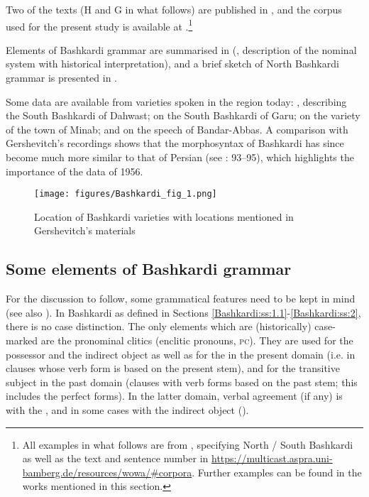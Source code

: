 \documentclass[output=paper,colorlinks,citecolor=brown]{langscibook}
\begin{document}
Two of the texts (H and G in what follows) are published in \citet{korn_bashkardi_2021,korn_greeting_2021}, and the corpus used for the present study is available at \citet{korn_bashkardi_N_2022,korn_bashkardi_S_2022}.\footnote{\label{fn:korn:3}All examples in what follows are from \citet{korn_bashkardi_N_2022,korn_bashkardi_S_2022}, specifying North / South Bashkardi as well as the text and sentence number in \url{https://multicast.aspra.uni-bamberg.de/resources/wowa/\#corpora}. Further examples can be found in the works mentioned in this section.}

Elements of Bashkardi grammar are summarised in \citeauthor{korn_notes_2017} (\citeyear{korn_notes_2017}, description of the nominal system with historical interpretation), and a brief sketch of North Bashkardi grammar is presented in \citet{korn_greeting_2021}. 

Some data are available from varieties spoken in the region today: \citet{seddiqinejad2010barresi}, describing the South Bashkardi of Dahwast; \citet{barbera_cannibal_2023,barbera2024Fool} on the South Bashkardi of Garu; \citet{barbera_lingua_2005,barbera_minabi_2020} on the variety of the town of Minab; and \citet{pelevin2010materials} on the speech of Bandar-Abbas. A comparison with Gershevitch's recordings shows that the morphosyntax of Bashkardi has since become much more similar to that of Persian (see \citealt{korn_notes_2017}: 93–95), which highlights the importance of the data of 1956. 

\begin{figure}
 \texttt{[image: figures/Bashkardi\_fig\_1.png]}
 \caption{Location of Bashkardi varieties with locations mentioned in Gershevitch's materials}
 \label{Bashkardi:fig:1}
\end{figure}

\subsection{Some elements of Bashkardi grammar}\label{Bashkardi:ss:1.3}

For the discussion to follow, some grammatical features need to be kept in mind (see also ). In Bashkardi as defined in Sections \ref{Bashkardi:ss:1.1}-\ref{Bashkardi:ss:2}, there is no case distinction. The only elements which are (historically) case-marked are the pronominal clitics (enclitic pronouns, \textsc{pc}). They are used for the possessor and the indirect object as well as for the  in the present domain (i.e. in clauses whose verb form is based on the present stem), and for the transitive subject in the past domain (clauses with verb forms based on the past stem; this includes the perfect forms). In the latter domain, verbal agreement (if any) is with the , and in some cases with the indirect object ().
\end{document}

